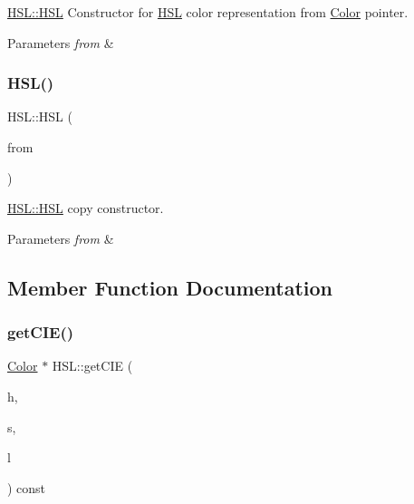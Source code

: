 \hyperlink{class_h_s_l_af90e79ad88ecb7944c313330d4bde182}{H\+S\+L\+::\+H\+SL} Constructor for \hyperlink{class_h_s_l}{H\+SL} color representation from \hyperlink{class_color}{Color} pointer. 


\begin{DoxyParams}{Parameters}
{\em from} & \\
\hline
\end{DoxyParams}
\mbox{\label{class_h_s_l_a165c0123fc7294e7ccdc53fc11c57154}} 
\subsubsection{\texorpdfstring{H\+S\+L()}{HSL()}\hspace{0.1cm}{\footnotesize\ttfamily [3/3]}}
{\footnotesize\ttfamily H\+S\+L\+::\+H\+SL (\begin{DoxyParamCaption}\item[{const \hyperlink{class_h_s_l}{H\+SL} \&}]{from }\end{DoxyParamCaption})}



\hyperlink{class_h_s_l_af90e79ad88ecb7944c313330d4bde182}{H\+S\+L\+::\+H\+SL} copy constructor. 


\begin{DoxyParams}{Parameters}
{\em from} & \\
\hline
\end{DoxyParams}


\subsection{Member Function Documentation}
\mbox{\label{class_h_s_l_ad755c96eff0cc73dea69c007d745dd4e}} 
\subsubsection{\texorpdfstring{get\+C\+I\+E()}{getCIE()}}
{\footnotesize\ttfamily \hyperlink{class_color}{Color} $\ast$ H\+S\+L\+::get\+C\+IE (\begin{DoxyParamCaption}\item[{double}]{h,  }\item[{double}]{s,  }\item[{double}]{l }\end{DoxyParamCaption}) const}



